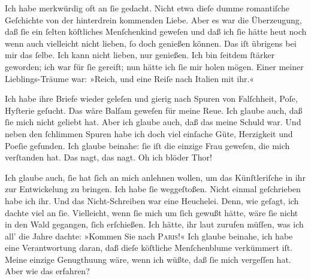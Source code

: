 \pstart
           Ich habe merkwürdig oft an{ }ſie gedacht. Nicht etwa dieſe dumme romantiſche Geſchichte
               von der hinterdrein kommenden Liebe. Aber  es war
               die Überzeugung, daß ſie ein{ }ſelten köſtliches Menſchenkind geweſen {\pb}und daß ich{ }ſie hätte
                  heut noch wenn auch vielleicht nicht lieben,{ }ſo
               doch genießen können. Das iſt übrigens bei mir das{ }ſelbe. Ich kann nicht lieben, nur
               genießen. Ich bin{ }ſeitdem{ }ſtärker geworden; ich war für{ }ſie gereift; nun hätte ich{ }ſie mir holen mögen. Einer meiner Lieblings-Träume war: »Reich, und eine Reiſe nach
                  Italien mit ihr.«\pend
           
\pstart
           Ich habe ihre Briefe wieder geleſen und gierig nach Spuren von Falſchheit, Poſe,
               Hyſterie geſucht. Das wäre Balſam geweſen für meine Reue. Ich glaube auch, daß{ }ſie
               mich nicht geliebt hat. Aber ich glaube auch, daß das meine Schuld war. Und neben den
                  {\pb}ſchlimmen Spuren habe ich doch viel einſache
               Güte, Herzigkeit und Poeſie gefunden. Ich glaube beinahe:{ }ſie iſt die einzige Frau
               geweſen, die mich \strikeout{\textcolor{gray}{ver}} verſtanden hat. Das nagt, das nagt. Oh ich blöder Thor!\pend
           
\pstart
           Ich glaube auch,{ }ſie hat{ }ſich an mich anlehnen wollen, um das Künſtleriſche in ihr
               zur Entwickelung zu bringen. Ich habe{ }ſie weggeſtoßen. Nicht einmal geſchrieben habe
               ich ihr. Und das Nicht-Schreiben war eine Heuchelei. Denn, wie geſagt, ich dachte
               viel an{ }ſie. Vielleicht, wenn{ }ſie mich um{ }ſich gewußt hätte, wäre{ }ſie nicht in den
               Wald {\pb}gegangen,{ }ſich erſchießen. Ich hätte, ihr laut
               zurufen müſſen, was ich all’ die Jahre dachte: »Kommen Sie nach \textsc{Paris}!« Ich glaube beinahe, ich habe eine Verantwortung daran, daß dieſe köſtliche
                  Menſchenblume verkümmert
               iſt. Meine einzige Genugthuung wäre, wenn ich wüßte, daß{ }ſie mich vergeſſen hat. Aber
               wie das erfahren?\pend
           
